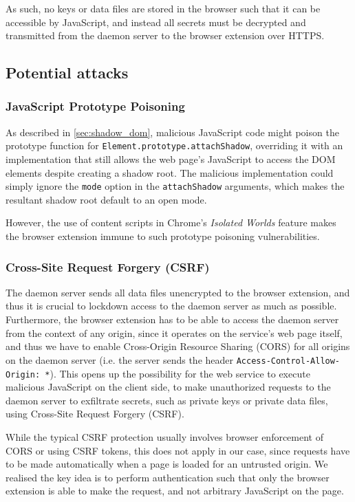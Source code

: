 \documentclass[letterpaper,twocolumn,10pt]{article}
\begin{document}
As such, no keys or data files are stored in the browser such that it can be accessible by JavaScript, and instead all secrets must be decrypted and transmitted from the daemon server to the browser extension over HTTPS.

\subsection{Potential attacks}

\subsubsection{JavaScript Prototype Poisoning}

As described in \cref{sec:shadow_dom}, malicious JavaScript code might poison the prototype function for \texttt{Element.prototype.attachShadow}, overriding it with an implementation that still allows the web page's JavaScript to access the DOM elements despite creating a shadow root. The malicious implementation could simply ignore the \texttt{mode} option in the \texttt{attachShadow} arguments, which makes the resultant shadow root default to an open mode.

However, the use of content scripts in Chrome's \textit{Isolated Worlds} feature \cite{ContentScript} makes the browser extension immune to such prototype poisoning vulnerabilities.

\subsubsection{Cross-Site Request Forgery (CSRF)}

The daemon server sends all data files unencrypted to the browser extension, and thus it is crucial to lockdown access to the daemon server as much as possible. Furthermore, the browser extension has to be able to access the daemon server from the context of any origin, since it operates on the service's web page itself, and thus we have to enable Cross-Origin Resource Sharing (CORS) for all origins on the daemon server (i.e. the server sends the header \texttt{Access-Control-Allow-Origin: *}). This opens up the possibility for the web service to execute malicious JavaScript on the client side, to make unauthorized requests to the daemon server to exfiltrate secrets, such as private keys or private data files, using Cross-Site Request Forgery (CSRF).

While the typical CSRF protection usually involves browser enforcement of CORS or using CSRF tokens, this does not apply in our case, since requests have to be made automatically when a page is loaded for an untrusted origin. We realised the key idea is to perform authentication such that only the browser extension is able to make the request, and not arbitrary JavaScript on the page.
\end{document}
